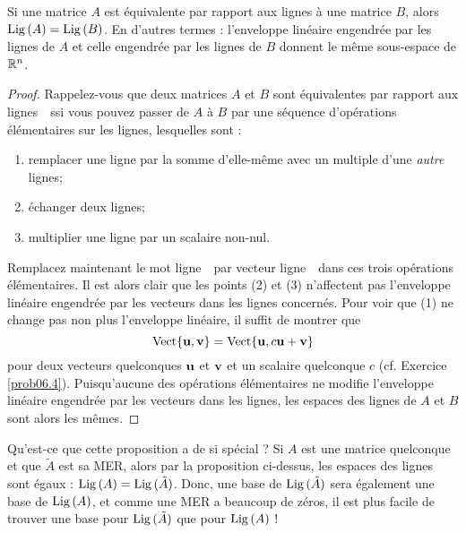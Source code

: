 \begin{proposition}\label{rowspaceInvariance}
Si une matrice $A$ est équivalente par rapport aux lignes à une matrice $B$, alors $\operatorname{Lig\,}(A) = \operatorname{Lig\,}(B)$.
En d'autres termes : l'enveloppe lin\'eaire engendr\'ee par les lignes de $A$ et celle engendrée par les lignes de $B$ donnent le même sous-espace 
de $\mathbb{R}^n$.
\end{proposition}

\begin{proof}
Rappelez-vous que deux matrices $A$ et $B$ sont \og équivalentes par rapport aux lignes\ \fg\ ssi vous pouvez passer de $A$ à
$B$ par une séquence d'opérations élémentaires sur les lignes, lesquelles sont :
\begin{enumerate}[(1)]
\item remplacer une ligne par la somme d'elle-même avec un multiple d'une \emph{autre} lignes;
\item échanger deux lignes;
\item multiplier une ligne par un scalaire non-nul.
\end{enumerate}

Remplacez maintenant le mot \og ligne\ \fg\ par \og vecteur ligne\ \fg\ dans ces trois op\'erations élémentaires. Il est alors clair que les points (2) et (3) n'affectent pas l'enveloppe lin\'eaire engendr\'ee par les vecteurs dans les lignes concernés. Pour voir que (1) ne change pas non plus l'enveloppe lin\'eaire, il suffit de montrer que
$$\textrm{Vect}\{\mathbf{u},\mathbf{v}\} = \textrm{Vect}\{ \mathbf{u}, c\mathbf{u} + \mathbf{v}\}
$$
pour deux vecteurs quelconques $\mathbf{u}$ et $\mathbf{v}$ et un scalaire quelconque $c$  (cf. Exercice \ref{prob06.4}).
Puisqu'aucune des opérations \'el\'ementaires ne modifie l'enveloppe lin\'eaire engendr\'ee par les vecteurs dans les lignes, les espaces des lignes de $A$ et $B$ sont alors les mêmes.
\end{proof}

Qu'est-ce que cette proposition a de si spécial ?  Si $A$ est une matrice quelconque et que $\tilde A$ est sa MER, alors par la proposition ci-dessus, les espaces des lignes sont égaux : $\operatorname{Lig\,}(A)=\operatorname{Lig\,}(\tilde A)$. Donc, une base de $\operatorname{Lig\,}(\tilde A)$ sera également une base de $\operatorname{Lig\,}(A)$, et comme une MER a beaucoup de zéros, il est plus facile de trouver une base pour $\operatorname{Lig\,}(\tilde A)$ que pour $\operatorname{Lig\,}(A)$ !

